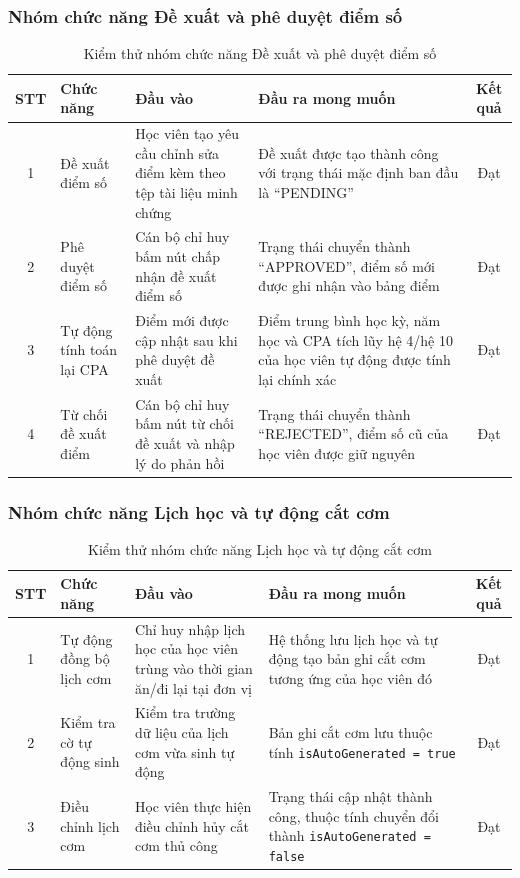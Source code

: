 \documentclass[../DoAn.tex]{subfiles}
\begin{document}
\subsubsection{Nhóm chức năng Đề xuất và phê duyệt điểm số}
\begin{table}[H]
\centering
\begin{tabular}{|c|p{3.2cm}|p{3.5cm}|p{5.5cm}|c|}
\hline
\textbf{STT} & \textbf{Chức năng} & \textbf{Đầu vào} & \textbf{Đầu ra mong muốn} & \textbf{Kết quả} \\ \hline
1 & Đề xuất điểm số & Học viên tạo yêu cầu chỉnh sửa điểm kèm theo tệp tài liệu minh chứng & Đề xuất được tạo thành công với trạng thái mặc định ban đầu là ``PENDING'' & Đạt \\ \hline
2 & Phê duyệt điểm số & Cán bộ chỉ huy bấm nút chấp nhận đề xuất điểm số & Trạng thái chuyển thành ``APPROVED'', điểm số mới được ghi nhận vào bảng điểm & Đạt \\ \hline
3 & Tự động tính toán lại CPA & Điểm mới được cập nhật sau khi phê duyệt đề xuất & Điểm trung bình học kỳ, năm học và CPA tích lũy hệ 4/hệ 10 của học viên tự động được tính lại chính xác & Đạt \\ \hline
4 & Từ chối đề xuất điểm & Cán bộ chỉ huy bấm nút từ chối đề xuất và nhập lý do phản hồi & Trạng thái chuyển thành ``REJECTED'', điểm số cũ của học viên được giữ nguyên & Đạt \\ \hline
\end{tabular}
\caption{Kiểm thử nhóm chức năng Đề xuất và phê duyệt điểm số}
\label{tab:de_xuat_phe_duyet_diem}
\end{table}

\subsubsection{Nhóm chức năng Lịch học và tự động cắt cơm}
\begin{table}[H]
\centering
\begin{tabular}{|c|p{3.2cm}|p{3.5cm}|p{5.5cm}|c|}
\hline
\textbf{STT} & \textbf{Chức năng} & \textbf{Đầu vào} & \textbf{Đầu ra mong muốn} & \textbf{Kết quả} \\ \hline
1 & Tự động đồng bộ lịch cơm & Chỉ huy nhập lịch học của học viên trùng vào thời gian ăn/đi lại tại đơn vị & Hệ thống lưu lịch học và tự động tạo bản ghi cắt cơm tương ứng của học viên đó & Đạt \\ \hline
2 & Kiểm tra cờ tự động sinh & Kiểm tra trường dữ liệu của lịch cơm vừa sinh tự động & Bản ghi cắt cơm lưu thuộc tính \texttt{isAutoGenerated = true} & Đạt \\ \hline
3 & Điều chỉnh lịch cơm & Học viên thực hiện điều chỉnh hủy cắt cơm thủ công & Trạng thái cập nhật thành công, thuộc tính chuyển đổi thành \texttt{isAutoGenerated = false} & Đạt \\ \hline
\end{tabular}
\caption{Kiểm thử nhóm chức năng Lịch học và tự động cắt cơm}
\label{tab:lich_hoc_cat_com}
\end{table}
\end{document}
